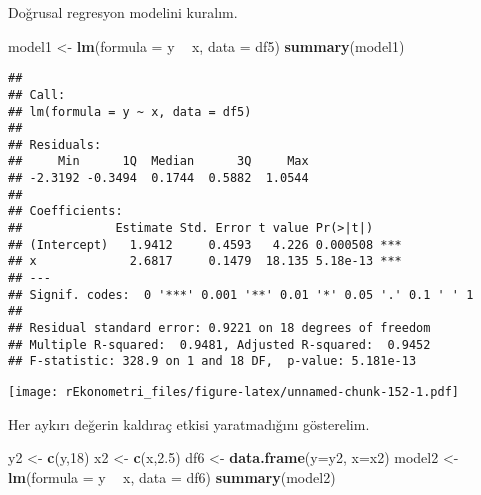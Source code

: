 \documentclass[
]{book}
\newenvironment{Shaded}{\begin{snugshade}}{\end{snugshade}}
\newcommand{\DataTypeTok}[1]{\textcolor[rgb]{0.13,0.29,0.53}{#1}}
\newcommand{\DecValTok}[1]{\textcolor[rgb]{0.00,0.00,0.81}{#1}}
\newcommand{\FloatTok}[1]{\textcolor[rgb]{0.00,0.00,0.81}{#1}}
\newcommand{\KeywordTok}[1]{\textcolor[rgb]{0.13,0.29,0.53}{\textbf{#1}}}
\newcommand{\NormalTok}[1]{#1}
\newcommand{\OperatorTok}[1]{\textcolor[rgb]{0.81,0.36,0.00}{\textbf{#1}}}
\newcommand{\OtherTok}[1]{\textcolor[rgb]{0.56,0.35,0.01}{#1}}
\newcommand{\StringTok}[1]{\textcolor[rgb]{0.31,0.60,0.02}{#1}}
\begin{document}
Doğrusal regresyon modelini kuralım.

\begin{Shaded}
\begin{Highlighting}[]
\NormalTok{model1 <-}\StringTok{ }\KeywordTok{lm}\NormalTok{(}\DataTypeTok{formula =}\NormalTok{ y }\OperatorTok{~}\StringTok{ }\NormalTok{x, }\DataTypeTok{data =}\NormalTok{ df5)}
\KeywordTok{summary}\NormalTok{(model1)}
\end{Highlighting}
\end{Shaded}

\begin{verbatim}
## 
## Call:
## lm(formula = y ~ x, data = df5)
## 
## Residuals:
##     Min      1Q  Median      3Q     Max 
## -2.3192 -0.3494  0.1744  0.5882  1.0544 
## 
## Coefficients:
##             Estimate Std. Error t value Pr(>|t|)    
## (Intercept)   1.9412     0.4593   4.226 0.000508 ***
## x             2.6817     0.1479  18.135 5.18e-13 ***
## ---
## Signif. codes:  0 '***' 0.001 '**' 0.01 '*' 0.05 '.' 0.1 ' ' 1
## 
## Residual standard error: 0.9221 on 18 degrees of freedom
## Multiple R-squared:  0.9481, Adjusted R-squared:  0.9452 
## F-statistic: 328.9 on 1 and 18 DF,  p-value: 5.181e-13
\end{verbatim}

\begin{Shaded}
\end{Shaded}

\texttt{[image: rEkonometri\_files/figure-latex/unnamed-chunk-152-1.pdf]}

Her aykırı değerin kaldıraç etkisi yaratmadığını gösterelim.

\begin{Shaded}
\begin{Highlighting}[]
\NormalTok{y2 <-}\StringTok{ }\KeywordTok{c}\NormalTok{(y,}\DecValTok{18}\NormalTok{)}
\NormalTok{x2 <-}\StringTok{ }\KeywordTok{c}\NormalTok{(x,}\FloatTok{2.5}\NormalTok{)}
\NormalTok{df6 <-}\StringTok{ }\KeywordTok{data.frame}\NormalTok{(}\DataTypeTok{y=}\NormalTok{y2, }\DataTypeTok{x=}\NormalTok{x2)}
\NormalTok{model2 <-}\StringTok{ }\KeywordTok{lm}\NormalTok{(}\DataTypeTok{formula =}\NormalTok{ y }\OperatorTok{~}\StringTok{ }\NormalTok{x, }\DataTypeTok{data =}\NormalTok{ df6)}
\KeywordTok{summary}\NormalTok{(model2)}
\end{Highlighting}
\end{Shaded}
\end{document}
